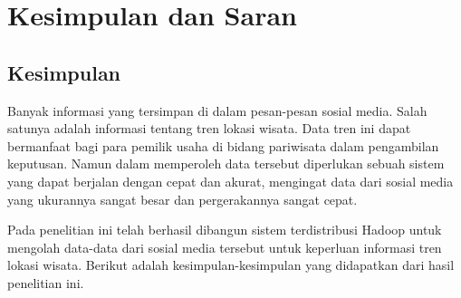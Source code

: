 \chapter{Kesimpulan dan Saran}

\section{Kesimpulan}
Banyak informasi yang tersimpan di dalam pesan-pesan sosial media. Salah satunya adalah informasi tentang tren lokasi wisata. Data tren ini dapat bermanfaat bagi para pemilik usaha di bidang pariwisata dalam pengambilan keputusan. Namun dalam memperoleh data tersebut diperlukan sebuah sistem yang dapat berjalan dengan cepat dan akurat, mengingat data dari sosial media yang ukurannya sangat besar dan pergerakannya sangat cepat. 

Pada penelitian ini telah berhasil dibangun sistem terdistribusi Hadoop untuk mengolah data-data dari sosial media tersebut untuk keperluan informasi tren lokasi wisata. Berikut adalah kesimpulan-kesimpulan yang didapatkan dari hasil penelitian ini. 

